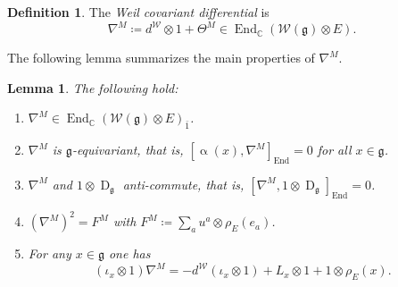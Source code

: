 \documentclass[11pt]{amsart}
\newcommand{\End}{\operatorname{End}}
\newcommand{\Dirac}{\operatorname{D}}
\def\gg{{\mathfrak{g}}}
\theoremstyle{plain}
\newtheorem{lemma}[theorem]{Lemma}
\theoremstyle{remark}
\theoremstyle{definition}
\newtheorem{definition}[theorem]{Definition}
\numberwithin{equation}{section}
\theoremstyle{remark}
\begin{document}
\begin{definition}
 The \emph{Weil covariant differential} is 
 \[
 \nabla^{M}\coloneqq d^{\mathcal{W}} \otimes 1 + \Theta^{M} \in \End_{\mathbb{C}}(\mathcal{W}(\gg) \otimes E).
 \]
\end{definition}

The following lemma summarizes the main properties of $\nabla^{M}$.

\begin{lemma} \label{lemm::properties_covariant_differential}
 The following hold:
 \begin{enumerate}
 \item[a)] $\nabla^{M} \in \End_{\mathbb{C}}(\mathcal{W}(\gg)\otimes E)_{\bar{1}}$.
 \item[b)] $\nabla^{M}$ is $\gg$-equivariant, that is, $[\upalpha(x),\nabla^{M}]_{\End}=0$ for all $x \in \gg$.
 \item[c)] $\nabla^{M}$ and $1\otimes \Dirac_{\gg}$ anti-commute, that is, $[\nabla^{M}, 1\otimes \Dirac_{\gg}]_{\End}=0$.
 \item[d)] $(\nabla^{M})^{2}=F^{M}$ with $F^{M}\coloneqq \sum_{a}u^{a}\otimes \rho_{E}(e_{a})$.
 \item[e)] For any $x \in \gg$ one has
\[
(\iota_{x}\otimes 1)\nabla^{M}=-d^{\mathcal{W}}(\iota_{x}\otimes 1)+L_{x}\otimes 1+ 1 \otimes \rho_{E}(x).
\]
 \end{enumerate}
\end{lemma}
\end{document}
